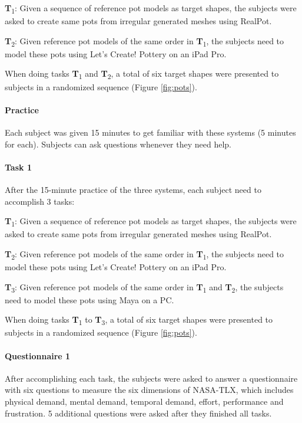 \documentclass{svjour3}                     %
\begin{document}
\textbf{T}\textsubscript{1}: Given a sequence of reference pot models as target shapes, the subjects were asked to create same pots from irregular generated meshes using RealPot. 

\textbf{T}\textsubscript{2}: Given reference pot models of the same order in \textbf{T}\textsubscript{1}, the subjects need to model these pots using Let's Create! Pottery on an iPad Pro.

When doing tasks \textbf{T}\textsubscript{1} and \textbf{T}\textsubscript{2}, a total of six target shapes were presented to subjects in a randomized sequence (Figure \ref{fig:pots}).








\paragraph{Practice} Each subject was given 15 minutes to get familiar with these systems (5 minutes for each). Subjects can ask questions whenever they need help.

\paragraph{Task 1} After the 15-minute practice of the three systems, each subject need to accomplish 3 tasks:

\textbf{T}\textsubscript{1}: Given a sequence of reference pot models as target shapes, the subjects were asked to create same pots from irregular generated meshes using RealPot. 

\textbf{T}\textsubscript{2}: Given reference pot models of the same order in \textbf{T}\textsubscript{1}, the subjects need to model these pots using Let's Create! Pottery on an iPad Pro.

\textbf{T}\textsubscript{3}: Given reference pot models of the same order in \textbf{T}\textsubscript{1} and \textbf{T}\textsubscript{2}, the subjects need to model these pots using Maya on a PC.

When doing tasks \textbf{T}\textsubscript{1} to \textbf{T}\textsubscript{3}, a total of six target shapes were presented to subjects in a randomized sequence (Figure \ref{fig:pots}).

\paragraph{Questionnaire 1} After accomplishing each task, the subjects were asked to answer a questionnaire with six questions to measure the six dimensions of NASA-TLX, which includes physical demand, mental demand, temporal demand, effort, performance and frustration. 5 additional questions were asked after they finished all tasks.
\end{document}
